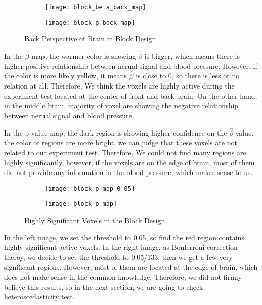 \begin{figure}[h]
\centering
\begin{subfigure}{.45\textwidth}
  \texttt{[image: block\_beta\_back\_map]}
\end{subfigure}%
\begin{subfigure}{.5\textwidth}
  \texttt{[image: block\_p\_back\_map]}
  \centering
\end{subfigure}
\caption{Back Perspective of Brain in Block Design\label{fig:bpBrain}}
\end{figure}

In the $\hat{\beta}$ map, the warmer color is showing $\hat{\beta}$ is 
bigger, which means there is higher positive relationship between nerual signal and
blood pressure. However, if the color is more likely yellow, it means 
$\hat{\beta}$ is close to 0, so there is less or no relation at all. 
Therefore, We think the voxels are highly active during the experiment test 
located at the center of front and back brain. On the other hand, in the middle
brain, majority of voxel are showing the negative relationship between nerual
signal and blood pressure.

In the p-value map, the dark region is showing higher confidence on the 
$\hat{\beta}$ value. the color of regions are more bright, we can judge that 
these voxels are not related to our experiment test. Therefore, We could not 
find many regions are highly significantly, however, if the voxels are on the 
edge of brain, most of them did not provide any information in the blood 
pressure, which makes sense to us.

\begin{figure}[h]
\centering
\begin{subfigure}{.46\textwidth}
  \texttt{[image: block\_p\_map\_0\_05]}
  \centering
\end{subfigure}%
\begin{subfigure}{.44\textwidth}
  \texttt{[image: block\_p\_map]}
  \centering
\end{subfigure}
\caption{Highly Significant Voxels in the Block Design\label{fig:hsVoxels}}
\end{figure}

In the left image, we set the threshold to 0.05, so find the red region contains
highly significant active voxels. In the right image, as Bonferroni correction
theroy, we decide to set the threshold to 0.05/133, then we get a few very 
significant regions. However, most of them are located at the edge of brain, 
which does not make sense in the common knowledge. Therefore, we did not firmly
believe this results, so in the next section, we are going to check heteroscedasticity
test.

